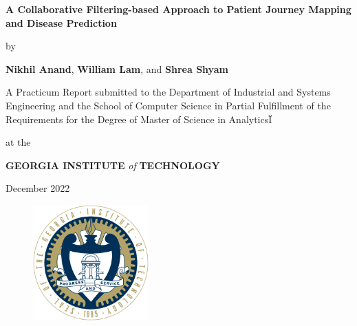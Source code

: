 \documentclass[twoside,11pt]{article}
\begin{document}
\raggedbottom


\begin{center}
\Huge{{\textbf{A Collaborative Filtering-based Approach to Patient Journey Mapping and Disease Prediction}}}
\end{center}

\vspace{2em}

\begin{center}
	by

	\vspace{1em}

	\textbf{Nikhil Anand}, \textbf{William Lam}, and \textbf{Shrea Shyam}
\end{center}

\vspace{5em}

\begin{adjustwidth}{100pt}{100pt}
	\small{A Practicum Report submitted to the Department of Industrial and Systems Engineering and the School of Computer Science in Partial Fulfillment of the Requirements for the Degree of Master of Science in Analytics}Ï

	\vspace{2em}

	\begin{center}
		\small{at the}

		\small{\textbf{GEORGIA INSTITUTE} \textit{of} \textbf{TECHNOLOGY}}

		\small{December 2022}
	\end{center}
\end{adjustwidth}

\vfill

\begin{figure}[H]
	\centering
	\includegraphics[width=12em]{images/gatech-seal.png}
\end{figure}

\end{document}
